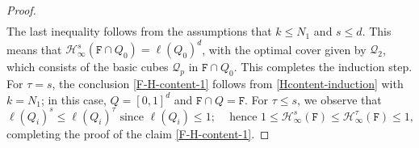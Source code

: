 \documentclass[a4paper,11pt]{amsart}
\numberwithin{equation}{section}
\begin{document}
\begin{proof}
\begin{align*}
\end{align*}  
The last inequality follows from the assumptions that $k \leq N_1$ and $s \leq d$. This means that $\mathcal H_{\infty}^{s}(\mathtt F \cap Q_0) = \ell(Q_0)^{d}$, with the optimal cover given by $\mathcal Q_2$, which consists of the basic cubes $\mathscr{Q}_p$ in $\mathtt F \cap Q_0$. This completes the induction step.  
\vskip0.1in
\noindent For $\tau=s$, the conclusion \eqref{F-H-content-1} follows from \eqref{Hcontent-induction} with $k = N_1$; in this case, $Q = [0,1]^d$ and $\mathtt F \cap Q = \mathtt F$. For $\tau \leq s$, we observe that 
\[ \ell(Q_i)^s \leq \ell(Q_i)^{\tau} \text{ since $\ell(Q_i) \leq 1$;} \quad \text{ hence } 1 \leq \mathcal H_{\infty}^{s}(\mathtt F) \leq \mathcal H_{\infty}^{\tau}(\mathtt F) \leq 1, \]
completing the proof of the claim \eqref{F-H-content-1}.    
\end{proof} 
\end{document}
